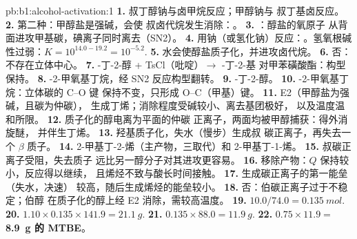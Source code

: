 \begin{solution}{pb:b1:alcohol-activation:1}
\textbf{1.} 叔丁醇钠与卤甲烷反应；甲醇钠与
叔丁基卤反应。
\textbf{2.} 第二种：甲醇盐是强碱，会使
叔卤代烷发生消除：。
\textbf{3.} ：醇盐的氧原子
从背面进攻甲基碳，碘离子同时离去（SN2）。
\textbf{4.} 用钠（或氢化钠）反应：。氢氧根碱性过弱：$K = 10^{14.0 -
19.2} = 10^{-5.2}$.
\textbf{5.} 水会使醇盐质子化，并进攻卤代烷。
\textbf{6.} 否：不存在立体中心。
\textbf{7.} -丁-2-醇 + TsCl（吡啶）$\to$ -丁-2-基
对甲苯磺酸酯：构型保持。
\textbf{8.} -2-甲氧基丁烷，经 SN2 反应构型翻转。
\textbf{9.} -丁-2-醇。
\textbf{10.} -2-甲氧基丁烷：立体碳的 C--O 键
保持不变，只形成 O--C（甲基）键。
\textbf{11.} E2（甲醇盐为强碱，且碳为仲碳），
生成丁烯；消除程度受碱较小、离去基团极好，
以及温度温和所限。
\textbf{12.} 质子化的醇电离为平面的仲碳
正离子，两面均被甲醇捕获：得外消旋醚，
并伴生丁烯。
\textbf{13.} 羟基质子化，失水（慢步）生成叔
碳正离子，再失去一个 $\beta$ 质子。
\textbf{14.} 2-甲基丁-2-烯（主产物，三取代）和
2-甲基丁-1-烯。
\textbf{15.} 叔碳正离子受阻，失去质子
远比另一醇分子对其进攻更容易。
\textbf{16.} 移除产物：$Q$ 保持较小，反应得以继续，
且烯烃不致与酸长时间接触。
\textbf{17.} 生成碳正离子的第一能垒（失水，决速）
较高，随后生成烯烃的能垒较小。
\textbf{18.} 否：伯碳正离子过于不稳定；伯醇
在质子化的醇上经 E2 消除，需较高温度。
\textbf{19.} $10.0/74.0 = \qty{0.135}{mol}$.
\textbf{20.} $1.10 \times 0.135 \times 141.9 = \qty{21.1}{g}$.
\textbf{21.} $0.135 \times 88.0 = \qty{11.9}{g}$.
\textbf{22.} $0.75 \times 11.9 =$ \textbf{\qty{8.9}{g} 的 MTBE}。
\end{solution}
